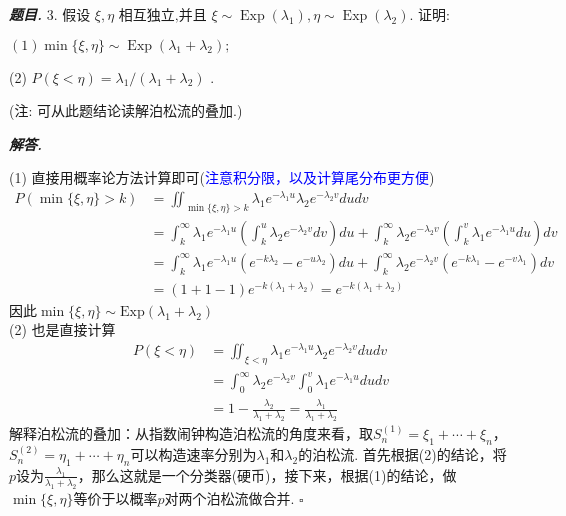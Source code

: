 \documentclass[10pt, a4paper, oneside]{ctexart}
\newenvironment{problem}{\begin{framed}\par\noindent\textbf{\textit{题目. }}}{\end{framed}\par}
\newenvironment{solution}{%
  \par\noindent\textbf{\textit{解答. }}\ignorespaces
}{%
  \hfill\ensuremath{\square}\par %
}
\begin{document}
\begin{problem}
    3.\( \text{ 假设 }\xi ,\eta \text{ 相互独立,并且 }\xi  \sim  \operatorname{Exp}\left( {\lambda }_{1}\right) ,\eta  \sim  \operatorname{Exp}\left( {\lambda }_{2}\right) .\text{ 证明: }  \)

\( \left( 1\right) \min \{ \xi ,\eta \}  \sim  \operatorname{Exp}\left( {{\lambda }_{1} + {\lambda }_{2}}\right) ; \)

(2) \( P\left( {\xi  < \eta }\right)  = {\lambda }_{1}/\left( {{\lambda }_{1} + {\lambda }_{2}}\right)  \) .

(注: 可从此题结论读解泊松流的叠加.)
\end{problem}
\begin{solution}
    (1) 直接用概率论方法计算即可(\textcolor{blue}{注意积分限，以及计算尾分布更方便})
    \begin{align*}
        P(\min\{\xi,\eta\}>k)&=\iint_{\min\{\xi,\eta\}>k} \lambda_1e^{-\lambda_1 u}\lambda_2e^{-\lambda_2 v}du dv\\
        &=\int_{k}^{\infty}\lambda_1e^{-\lambda_1 u}\left(\int_{k}^u \lambda_2e^{-\lambda_2 v} dv\right)du+\int_{k}^{\infty}\lambda_2e^{-\lambda_2 v}\left(\int_{k}^v \lambda_1e^{-\lambda_1 u} du\right)dv\\
        &=\int_{k}^{\infty}\lambda_1e^{-\lambda_1 u}\left(e^{-k\lambda_2}-e^{-u\lambda_2}\right)du+\int_{k}^{\infty}\lambda_2e^{-\lambda_2 v}\left(e^{-k\lambda_1}-e^{-v\lambda_1}\right)dv\\
        &=(1+1-1)e^{-k(\lambda_1+\lambda_2)}=e^{-k(\lambda_1+\lambda_2)}
    \end{align*}
    因此$\min\{\xi,\eta\}\sim \text{Exp}(\lambda_1+\lambda_2)$\\
    (2) 也是直接计算
    \begin{align*}
        P(\xi<\eta)&=\iint_{\xi<\eta}\lambda_1e^{-\lambda_1 u}\lambda_2e^{-\lambda_2 v}du dv\\
        &=\int_0^{\infty} \lambda_2e^{-\lambda_2 v}\int_0^{v}\lambda_1e^{-\lambda_1 u}du dv\\
        &=1-\frac{\lambda_2}{\lambda_1+\lambda_2}=\frac{\lambda_1}{\lambda_1+\lambda_2}
    \end{align*}
    解释泊松流的叠加：从指数闹钟构造泊松流的角度来看，取$S_n^{(1)}=\xi_1+\cdots+\xi_n$，$S_n^{(2)}=\eta_1+\cdots+\eta_n$可以构造速率分别为$\lambda_1$和$\lambda_2$的泊松流. 首先根据(2)的结论，将$p$设为$\frac{\lambda_1}{\lambda_1+\lambda_2}$，那么这就是一个分类器(硬币)，接下来，根据(1)的结论，做$\min\{\xi,\eta\}$等价于以概率$p$对两个泊松流做合并.
\end{solution}
\end{document}
